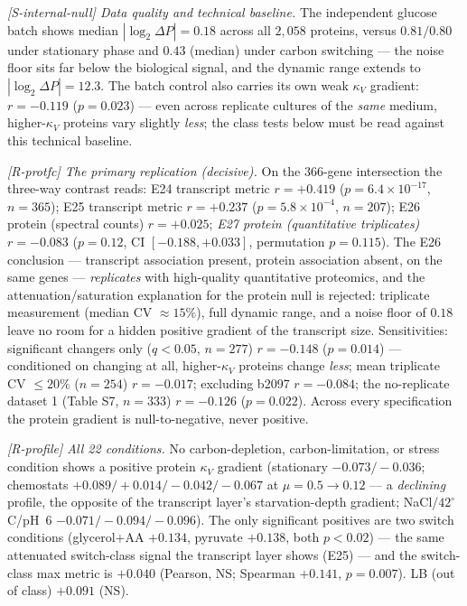 \documentclass[11pt,a4paper]{article}
\theoremstyle{plain}
\theoremstyle{definition}
\theoremstyle{remark}
\begin{document}
\emph{[S-internal-null] Data quality and technical baseline.} The
independent glucose batch shows median $|\log_2 \Delta P| = 0.18$
across all $2{,}058$ proteins, versus $0.81/0.80$ under stationary
phase and $0.43$ (median) under carbon switching --- the noise
floor sits far below the biological signal, and the dynamic range
extends to $|\log_2 \Delta P| = 12.3$. The batch control also
carries its own weak $\kappa_V$ gradient: $r = -0.119$ ($p =
0.023$) --- even across replicate cultures of the \emph{same}
medium, higher-$\kappa_V$ proteins vary slightly \emph{less}; the
class tests below must be read against this technical baseline.

\emph{[R-protfc] The primary replication (decisive).} On the
$366$-gene intersection the three-way contrast reads: E24
transcript metric $r = +0.419$ ($p = 6.4 \times 10^{-17}$, $n =
365$); E25 transcript metric $r = +0.237$ ($p = 5.8 \times
10^{-4}$, $n = 207$); E26 protein (spectral counts) $r = +0.025$;
\emph{E27 protein (quantitative triplicates) $r = -0.083$} ($p =
0.12$, CI $[-0.188, +0.033]$, permutation $p = 0.115$). The E26
conclusion --- transcript association present, protein association
absent, on the same genes --- \emph{replicates} with high-quality
quantitative proteomics, and the attenuation/saturation
explanation for the protein null is rejected: triplicate
measurement (median CV $\approx 15\%$), full dynamic range, and a
noise floor of $0.18$ leave no room for a hidden positive gradient
of the transcript size. Sensitivities: significant changers only
($q < 0.05$, $n = 277$) $r = -0.148$ ($p = 0.014$) --- conditioned
on changing at all, higher-$\kappa_V$ proteins change \emph{less};
mean triplicate CV $\leq 20\%$ ($n = 254$) $r = -0.017$;
excluding b2097 $r = -0.084$; the no-replicate dataset 1 (Table
S7, $n = 333$) $r = -0.126$ ($p = 0.022$). Across every
specification the protein gradient is null-to-negative, never
positive.

\emph{[R-profile] All 22 conditions.} No carbon-depletion,
carbon-limitation, or stress condition shows a positive protein
$\kappa_V$ gradient (stationary $-0.073/-0.036$; chemostats
$+0.089/+0.014/-0.042/-0.067$ at $\mu = 0.5 \to 0.12$ --- a
\emph{declining} profile, the opposite of the transcript layer's
starvation-depth gradient; NaCl/$42^{\circ}$C/pH~6
$-0.071/-0.094/-0.096$). The only significant positives are two
switch conditions (glycerol+AA $+0.134$, pyruvate $+0.138$, both
$p < 0.02$) --- the same attenuated switch-class signal the
transcript layer shows (E25) --- and the switch-class max metric is
$+0.040$ (Pearson, NS; Spearman $+0.141$, $p = 0.007$). LB (out of
class) $+0.091$ (NS).
\end{document}
